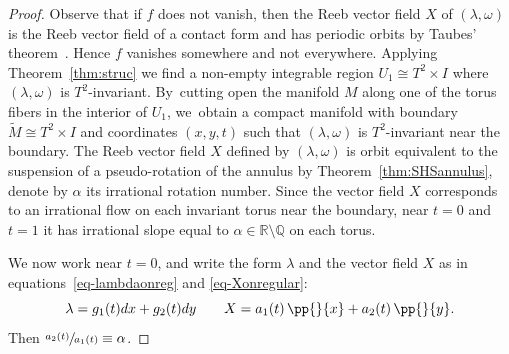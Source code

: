\begin{proof}
Observe that if $f$ does not vanish, then the Reeb vector field $X$ of $(\lambda, \omega)$ is the Reeb vector field of a contact form and has periodic orbits by Taubes' theorem~\cite{Taub}. Hence $f$ vanishes somewhere and not everywhere. Applying Theorem~\ref{thm:struc} we find a non-empty integrable region $U_1\cong T^2\times I$ where $(\lambda,\omega)$ is $T^2$-invariant. By~cutting open the manifold $M$ along one of the torus fibers in the interior of $U_1$, we~obtain a compact manifold with boundary $\widetilde M\cong T^2\times I$ and coordinates $(x,y,t)$ such that $(\lambda,\omega)$ is $T^2$-invariant near the boundary. The Reeb vector field $X$ defined by $(\lambda,\omega)$ is orbit equivalent to the suspension of a pseudo-rotation of the annulus by Theorem~\ref{thm:SHSannulus}, denote by $\alpha$ its irrational rotation number. Since the vector field $X$ corresponds to an irrational flow on each invariant torus near the boundary, near $t=0$ and $t=1$ it has irrational slope equal to $\alpha\in\mathbb{R}\setminus\mathbb{Q}$ on each torus.

We now work near $t=0$, and write the form $\lambda$ and the vector field $X$ as in equations~\eqref{eq-lambdaonreg} and \eqref{eq-Xonregular}:
\[
\lambda=g_1(t)dx+g_2(t)dy \qquad X= a_1(t)\,\pp{}{x}+a_2(t)\,\pp{}{y}.
\]
Then $\sfrac{a_2(t)}{a_1(t)}\equiv \alpha$.

\Changel


\end{proof}
